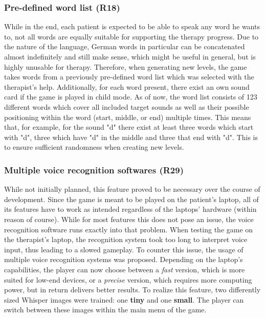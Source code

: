 \documentclass[draft,final]{vutinfth} %
\begin{document}
\subsubsection{Pre-defined word list (R18)}
While in the end, each patient is expected to be able to speak any word he wants to, not all words are equally suitable for supporting the therapy progress. Due to the nature of the language, German words in particular can be concatenated almost indefinitely and still make sense, which might be useful in general, but is highly unusable for therapy. Therefore, when generating new levels, the game takes words from a previously pre-defined word list which was selected with the therapist's help. Additionally, for each word present, there exist an own sound card if the game is played in child mode. As of now, the word list consists of 123 different words which cover all included target sounds as well as their possible positioning within the word (start, middle, or end) multiple times. This means that, for example, for the sound "d" there exist at least three words which start with "d", three which have "d"  in the middle and three that end with "d". This is to ensure sufficient randomness when creating new levels.

\subsubsection{Multiple voice recognition softwares (R29)}
While not initially planned, this feature proved to be necessary over the course of development. Since the game is meant to be played on the patient's laptop, all of its features have to work as intended regardless of the laptops' hardware (within reason of course). While for most features this does not pose an issue, the voice recognition software runs exactly into that problem. When testing the game on the therapist's laptop, the recognition system took too long to interpret voice input, thus leading to a slowed gameplay. To counter this issue, the usage of multiple voice recognition systems was proposed. Depending on the laptop's capabilities, the player can now choose between a \emph{fast} version, which is more suited for low-end devices, or a \emph{precise} version, which requires more computing power, but in return delivers better results. To realize this feature, two differently sized Whisper images were trained: one \textbf{tiny} and one \textbf{small}. The player can switch between these images within the main menu of the game.
\end{document}
